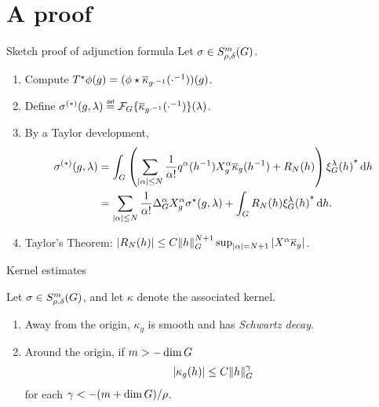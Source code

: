 \documentclass{beamer}
\begin{document}
\section{A proof}

\begin{frame}{Sketch proof of adjunction formula \cite{FischerRuzhansky16}}
    Let $\sigma \in \SymbolClass m {\rho, \delta}$.
    \begin{enumerate}
        \item Compute $\adj T \phi(g) = (\conv \phi {\conj \kappa_{g \dummy^{-1}}}(\dummy^{-1}))(g)$.
            \pause
        \item Define $\sigma^{(*)}(g, \lambda) \defeq \Fourier \{ \conj \kappa_{g \dummy^{-1}}(\dummy^{-1}) \}(\lambda)$.
            \pause
        \item By a Taylor development,
            \begin{align*}
                \sigma^{(*)}(g, \lambda)
                &= \int_\Group \left(\sum_{\abs \alpha \leq N} \frac 1 {\alpha !} q^\alpha(h^{-1}) \LeftDifferentialOperator [g] \alpha \conj \kappa_g(h^{-1}) + R_N(h)\right) \adj {\Rep \lambda(h)} \dd h\\
                &= \sum_{\abs \alpha \leq N} \frac 1 {\alpha !} \DifferenceOperatorOrder \alpha \LeftDifferentialOperator [g] \alpha \adj \sigma(g, \lambda) + \int_\Group R_N(h) \adj {\Rep \lambda(h)} \dd h.
            \end{align*}
            \pause
        \item
            Taylor's Theorem: $\abs {R_N(h)} \leq C \norm [\Group] h^{N + 1} \sup_{\abs \alpha = N + 1} \abs {\LeftDifferentialOperator \alpha \conj \kappa_g}$.
    \end{enumerate}
\end{frame}

\begin{frame}{Kernel estimates}
    \begin{theorem}
        Let $\sigma \in \SymbolClass m {\rho, \delta}$,
        and let $\kappa$ denote the associated kernel.

        \begin{enumerate}
            \item
                Away from the origin,
                $\kappa_g$ is smooth and has \emph{Schwartz decay}.
            \item
                Around the origin,
                if $m > -\dim \Group$
                \begin{align*}
                    \abs {\kappa_g(h)} \leq C \norm [\Group] h^{\gamma}
                \end{align*}
                for each $\gamma < -(m + \dim \Group) / \rho$.
        \end{enumerate}
    \end{theorem}
\end{frame}
\end{document}

